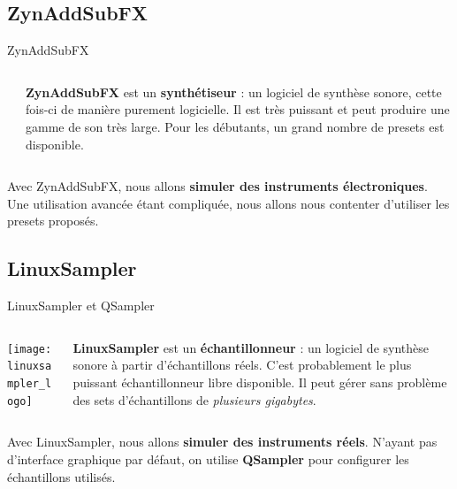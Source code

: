 \documentclass{beamer}
\begin{document}
\subsection{ZynAddSubFX}
\begin{frame}{ZynAddSubFX}
  \begin{columns}
  \begin{column}{0.15\textwidth}
    \def\svgwidth{\linewidth}
    
  \end{column}
  \begin{column}{0.85\textwidth}
    \textbf{ZynAddSubFX} est un \textbf{synthétiseur} : un logiciel de synthèse sonore, cette fois-ci de manière purement logicielle. Il est très puissant et peut produire une gamme de son très large. Pour les débutants, un grand nombre de presets est disponible.
  \end{column}
  \end{columns}
  \medskip
  
  Avec ZynAddSubFX, nous allons \textbf{simuler des instruments électroniques}.
  Une utilisation avancée étant compliquée, nous allons nous contenter d'utiliser les presets proposés.
\end{frame}

\subsection{LinuxSampler}
\begin{frame}{LinuxSampler et QSampler}
  \begin{columns}
  \begin{column}{0.15\textwidth}
    \texttt{[image: linuxsampler\_logo]}
  \end{column}
  \begin{column}{0.85\textwidth}
    \textbf{LinuxSampler} est un \textbf{échantillonneur} : un logiciel de synthèse sonore à partir d'échantillons réels. C'est probablement le plus puissant échantillonneur libre disponible. Il peut gérer sans problème des sets d'échantillons de \emph{plusieurs gigabytes}.
  \end{column}
  \end{columns}
  \medskip
  
  Avec LinuxSampler, nous allons \textbf{simuler des instruments réels}.
  N'ayant pas d'interface graphique par défaut, on utilise \textbf{QSampler} pour configurer les échantillons utilisés.
\end{frame}
\end{document}
